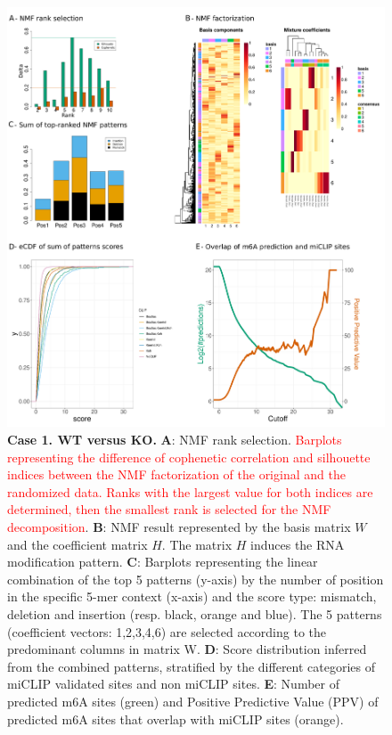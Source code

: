 \documentclass[times, 11pt, a4paper]{article}
\begin{document}
\begin{figure}[h!]
	\includegraphics[width = 1\textwidth]{img/res_wt_ko.pdf}
	\caption{\textbf{Case 1. WT  versus KO.}  \textbf{A}: NMF rank selection. \textcolor{red}{Barplots representing the difference of cophenetic correlation and silhouette indices between the NMF factorization of the original and the randomized data. Ranks with the largest value for both indices are determined, then the smallest rank is selected for the NMF decomposition}. \textbf{B}: NMF result represented by the basis matrix $W$ and the coefficient matrix $H$. The matrix $H$ induces the RNA modification pattern. \textbf{C}: Barplots representing the linear combination of the top 5 patterns (y-axis) by the number of position in the specific 5-mer context (x-axis) and the score type: mismatch, deletion and insertion (resp. black, orange and blue). The 5 patterns (coefficient vectors: 1,2,3,4,6) are selected according to the predominant columns in matrix W.  \textbf{D}: Score distribution inferred from the combined patterns, stratified by the different categories of miCLIP validated sites and non miCLIP sites.  \textbf{E}: Number of predicted m6A sites (green) and Positive Predictive Value (PPV) of predicted m6A sites that overlap with miCLIP sites (orange). }
	\label{fig:WT_KO}
\end{figure}
\end{document}
